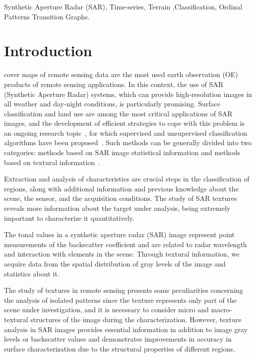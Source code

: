 \documentclass[journal]{IEEEtran}
\begin{document}
\begin{IEEEkeywords}
Synthetic Aperture Radar (SAR), Time-series, Terrain ,Classification, Ordinal Patterns Transition Graphs.
\end{IEEEkeywords}

\IEEEpeerreviewmaketitle

\section{Introduction}

 cover maps of remote sensing data are the most used earth observation (OE) products of remote sensing applications. In this context, the use of SAR (Synthetic Aperture Radar) systems, which can provide high-resolution images in all weather and day-night conditions, is particularly promising.
Surface classification and land use are among the most critical applications of SAR images, and the development of efficient strategies to cope with this problem is an ongoing research topic~\cite{Pottier2004Unsupervised}, for which supervised and unsupervised classification algorithms have been proposed~\cite{han2020unsupervised,huang2020classification,xie2020polsar}.
Such methods can be generally divided into two categories: methods based on SAR image statistical information and methods based on textural information~\cite{guan2019covariance}.

Extraction and analysis of characteristics are crucial steps in the classification of regions, along with additional information and previous knowledge about the scene, the sensor, and the acquisition conditions.
The study of SAR textures reveals more information about the target under analysis, being extremely important to characterize it quantitatively.

The tonal values in a synthetic aperture radar (SAR) image represent point measurements of the backscatter coefficient and are related to radar wavelength and interaction with elements in the scene.
Through textural information, we acquire data from the spatial distribution of gray levels of the image and statistics about it.

The study of textures in remote sensing presents some peculiarities concerning the analysis of isolated patterns since the texture represents only part of the scene under investigation, and it is necessary to consider micro and macro-textural structures of the image during the characterization.
However, texture analysis in SAR images provides essential information in addition to image gray levels or backscatter values and demonstrates improvements in accuracy in surface characterization due to the structural properties of different regions.
 
\end{document}
